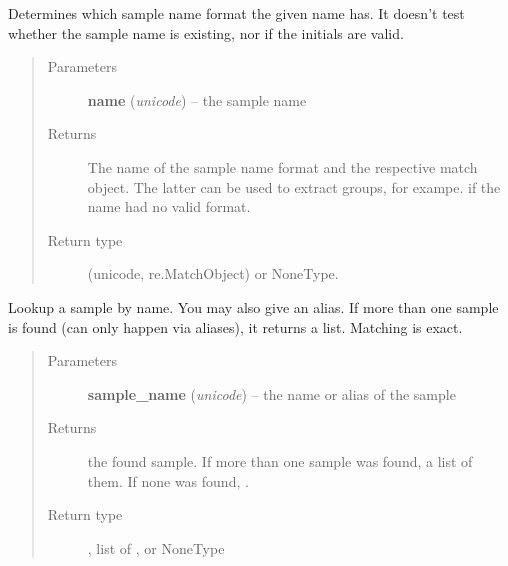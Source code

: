 \documentclass[a4paper,11pt,english]{sphinxmanual}
\begin{document}

\begin{fulllineitems}
\label{programming/utilities:samples.utils.views.sample_name_format}
Determines which sample name format the given name has.  It doesn't test
whether the sample name is existing, nor if the initials are valid.
\begin{quote}\begin{description}
\item[{Parameters}] \leavevmode
\textbf{name} (\emph{unicode}) -- the sample name

\item[{Returns}] \leavevmode
The name of the sample name format and the respective match object.  The
latter can be used to extract groups, for exampe.   if the name
had no valid format.

\item[{Return type}] \leavevmode
(unicode, re.MatchObject) or NoneType.

\end{description}\end{quote}

\end{fulllineitems}


\begin{fulllineitems}
\label{programming/utilities:samples.utils.views.get_sample}
Lookup a sample by name.  You may also give an alias.  If more than one
sample is found (can only happen via aliases), it returns a list.  Matching
is exact.
\begin{quote}\begin{description}
\item[{Parameters}] \leavevmode
\textbf{sample\_name} (\emph{unicode}) -- the name or alias of the sample

\item[{Returns}] \leavevmode
the found sample.  If more than one sample was found, a list of them.  If
none was found, .

\item[{Return type}] \leavevmode
{}, list of , or
NoneType

\end{description}\end{quote}

\end{fulllineitems}
\end{document}

